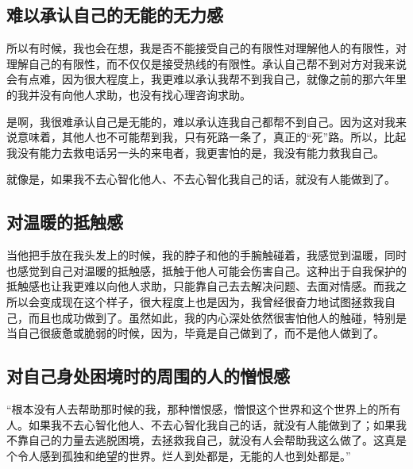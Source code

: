 





\subsection*{难以承认自己的无能的无力感}

所以有时候，我也会在想，我是否不能接受自己的有限性\pozhehao{}对理解他人的有限性，对理解自己的有限性，而不仅仅是接受热线的有限性。承认自己帮不到对方对我来说会有点难，因为很大程度上，我更难以承认我帮不到我自己，就像之前的那六年里的我并没有向他人求助，也没有找心理咨询求助。

是啊，我很难承认自己是无能的，难以承认连我自己都帮不到自己。因为这对我来说意味着，其他人也不可能帮到我，只有死路一条了，真正的“死”路。所以，比起我没有能力去救电话另一头的来电者，我更害怕的是，我没有能力救我自己。

就像是，如果我不去心智化他人、不去心智化我自己的话，就没有人能做到了。







\subsection*{对温暖的抵触感}

当他把手放在我头发上的时候，我的脖子和他的手腕触碰着，我感觉到温暖，同时也感觉到自己对温暖的抵触感，抵触于他人可能会伤害自己。这种出于自我保护的抵触感也让我更难以向他人求助，只能靠自己去去解决问题、去面对情感。而我之所以会变成现在这个样子，很大程度上也是因为，我曾经很奋力地试图拯救我自己，而且也成功做到了。虽然如此，我的内心深处依然很害怕他人的触碰，特别是当自己很疲惫或脆弱的时候，因为，毕竟是自己做到了，而不是他人做到了。







\subsection*{对自己身处困境时的周围的人的憎恨感}

“根本没有人去帮助那时候的我，那种憎恨感，憎恨这个世界和这个世界上的所有人。如果我不去心智化他人、不去心智化我自己的话，就没有人能做到了；如果我不靠自己的力量去逃脱困境，去拯救我自己，就没有人会帮助我这么做了。这真是个令人感到孤独和绝望的世界。烂人到处都是，无能的人也到处都是。”

